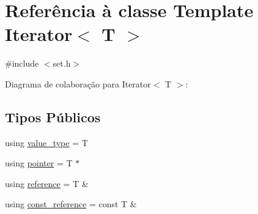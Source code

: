 \hypertarget{classIterator}{}\section{Referência à classe Template Iterator$<$ T $>$}
\label{classIterator}


{\ttfamily \#include $<$set.\+h$>$}



Diagrama de colaboração para Iterator$<$ T $>$\+:
\subsection*{Tipos Públicos}
\begin{DoxyCompactItemize}
\item 
using \hyperlink{classIterator_ab30ee4ae468e806a7897d6a0c7705c54}{value\+\_\+type} = T
\item 
using \hyperlink{classIterator_a37c4732ae0b73e9fdc3a585c01750d05}{pointer} = T $\ast$
\item 
using \hyperlink{classIterator_a104c7f213cd33d599aa25277176529d5}{reference} = T \&
\item 
using \hyperlink{classIterator_a1b795038f98a4fcd76a167740fbd1ddb}{const\+\_\+reference} = const T \&
\end{DoxyCompactItemize}
